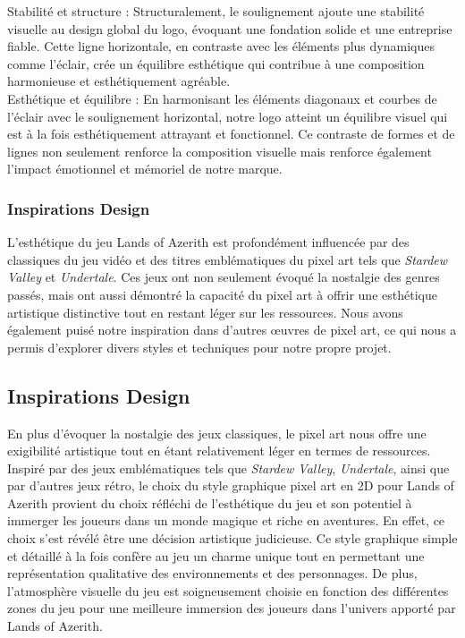 Stabilité et structure : Structuralement, le soulignement ajoute une stabilité visuelle au design global du logo, évoquant une fondation solide et une entreprise fiable.
Cette ligne horizontale, en contraste avec les éléments plus dynamiques comme l'éclair, crée un équilibre esthétique qui contribue à une composition harmonieuse et esthétiquement agréable.
\\

Esthétique et équilibre : En harmonisant les éléments diagonaux et courbes de l'éclair avec le soulignement horizontal, notre logo atteint un équilibre visuel qui est à la fois esthétiquement attrayant et fonctionnel.
Ce contraste de formes et de lignes non seulement renforce la composition visuelle mais renforce également l'impact émotionnel et mémoriel de notre marque.

\subsubsection{Inspirations Design}

L'esthétique du jeu Lands of Azerith est profondément influencée par des classiques du jeu vidéo et des titres emblématiques du pixel art tels que \textit{Stardew Valley} et \textit{Undertale}.
Ces jeux ont non seulement évoqué la nostalgie des genres passés, mais ont aussi démontré la capacité du pixel art à offrir une esthétique artistique distinctive tout en restant léger sur les ressources.
Nous avons également puisé notre inspiration dans d'autres œuvres de pixel art, ce qui nous a permis d'explorer divers styles et techniques pour notre propre projet.

\subsection{Inspirations Design}

En plus d'évoquer la nostalgie des jeux classiques, le pixel art nous offre une exigibilité artistique tout en étant relativement léger en termes de ressources.
Inspiré par des jeux emblématiques tels que \textit{Stardew Valley}, \textit{Undertale}, ainsi que par d'autres jeux rétro, le choix du style graphique pixel art en 2D pour Lands of Azerith provient du choix réfléchi de l'esthétique du jeu et son potentiel à immerger les joueurs dans un monde magique et riche en aventures.
En effet, ce choix s'est révélé être une décision artistique judicieuse.
Ce style graphique simple et détaillé à la fois confère au jeu un charme unique tout en permettant une représentation qualitative des environnements et des personnages.
De plus, l'atmosphère visuelle du jeu est soigneusement choisie en fonction des différentes zones du jeu pour une meilleure immersion des joueurs dans l'univers apporté par Lands of Azerith.

